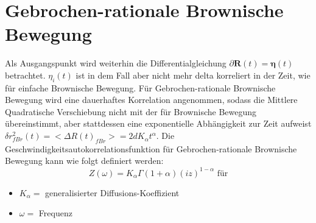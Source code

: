 \documentclass[
  a4paper,BCOR10mm,oneside,
  bibtotoc,idxtotoc,
  headsepline,footsepline,%
  fleqn,openbib
]{scrbook}
\begin{document}
\section{Gebrochen-rationale Brownische Bewegung}
Als Ausgangspunkt wird weiterhin die Differentialgleichung $\partial \boldsymbol{R}(t) = \boldsymbol{\eta}(t)$ betrachtet. $\eta_i(t)$ ist in dem Fall aber nicht mehr delta korreliert in der Zeit, wie für einfache Brownische Bewegung. Für Gebrochen-rationale Brownische Bewegung wird eine dauerhaftes Korrelation angenommen, sodass die Mittlere Quadratische Verschiebung nicht mit der für Brownische Bewegung übereinstimmt, aber stattdessen eine exponentielle Abhängigkeit zur Zeit aufweist $\delta r^{2}_{fBr}(t)= < \Delta R(t)_{fBr}>=2dK_{\alpha}t^{\alpha}$. 
Die Geschwindigkeitsautokorrelationsfunktion für Gebrochen-rationale Brownische Bewegung kann wie folgt definiert werden:
\begin{equation}
Z(\omega)= K_{\alpha} \Gamma(1+\alpha)(i z)^{1-\alpha} \text{   für} 
\end{equation}
\begin{itemize}
 \item $K_{\alpha} =$ generalisierter Diffusions-Koeffizient 
 \item $\omega = $ Frequenz 
\end{itemize}


\cite{Hofling2013}
\end{document}
